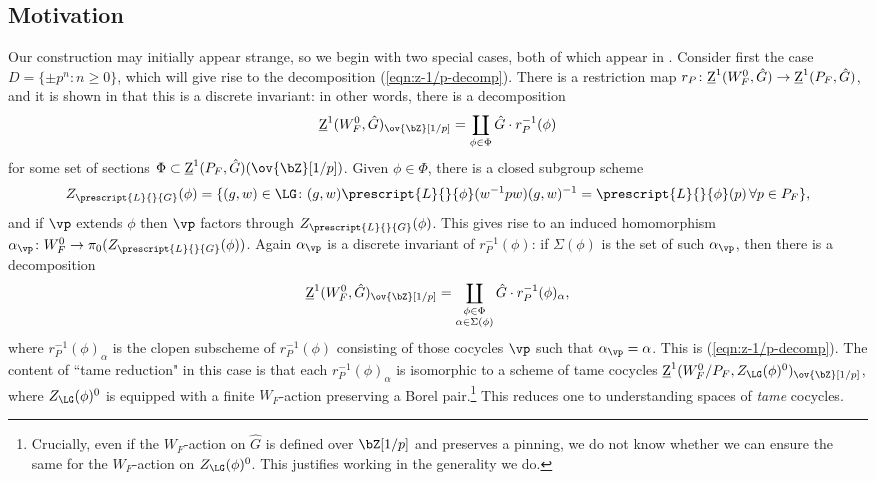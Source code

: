 \subsection{Motivation}\label{ss:motivation}

Our construction may initially appear strange, so we begin with two special cases, both of which appear in \cite{DHKM}. Consider first the case $D = \{\pm p^n\colon n \geq 0\}$, which will give rise to the decomposition (\ref{eqn:z-1/p-decomp}). There is a restriction map $r_P\colon \underline{\rm{Z}}^1(W_F^0, \hat{G}) \to \underline{\rm{Z}}^1(P_F, \hat{G})$, and it is shown in \cite[3.1]{DHKM} that this is a discrete invariant: in other words, there is a decomposition
\[
\underline{\rm{Z}}^1(W_F^0, \hat{G})_{\ov{\bZ}[1/p]} = \coprod_{\phi \in \Phi} \hat{G} \cdot r_P^{-1}(\phi)
\]
for some set of sections $\Phi \subset \underline{\rm{Z}}^1(P_F, \hat{G})(\ov{\bZ}[1/p])$. Given $\phi \in \Phi$, there is a closed subgroup scheme
\[
Z_{\prescript{L}{}{G}}(\phi) = \{(g, w) \in \LG \colon (g, w)\prescript{L}{}{\phi}(w^{-1}pw)(g, w)^{-1} = \prescript{L}{}{\phi}(p) \,\forall p \in P_F\},
\]
and if $\vp$ extends $\phi$ then $\vp$ factors through $Z_{\prescript{L}{}{G}}(\phi)$. This gives rise to an induced homomorphism $\alpha_{\vp}\colon W_F^0 \to \pi_0(Z_{\prescript{L}{}{G}}(\phi))$. Again $\alpha_{\vp}$ is a discrete invariant of $r_P^{-1}(\phi)$: if $\Sigma(\phi)$ is the set of such $\alpha_\vp$, then there is a decomposition
\[
    \underline{\rm{Z}}^1(W_F^0, \hat{G})_{\ov{\bZ}[1/p]} = \coprod_{\substack{\phi \in \Phi \\ \alpha \in \Sigma(\phi)}} \hat{G} \cdot r_P^{-1}(\phi)_\alpha,
\]
where $r_P^{-1}(\phi)_{\alpha}$ is the clopen subscheme of $r_P^{-1}(\phi)$ consisting of those cocycles $\vp$ such that $\alpha_{\vp} = \alpha$. This is (\ref{eqn:z-1/p-decomp}). The content of ``tame reduction" in this case is that each $r_P^{-1}(\phi)_\alpha$ is isomorphic to a scheme of tame cocycles $\underline{\rm{Z}}^1(W_F^0/P_F, Z_{\LG}(\phi)^0)_{\ov{\bZ}[1/p]}$, where $Z_{\LG}(\phi)^0$ is equipped with a finite $W_F$-action preserving a Borel pair.\footnote{Crucially, even if the $W_F$-action on $\hat{G}$ is defined over $\bZ[1/p]$ and preserves a pinning, we do not know whether we can ensure the same for the $W_F$-action on $Z_{\LG}(\phi)^0$. This justifies working in the generality we do.} This reduces one to understanding spaces of \textit{tame} cocycles.\smallskip

